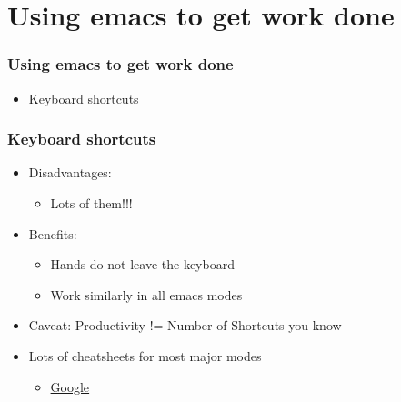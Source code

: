 \documentclass[t,10pt]{beamer}
\begin{document}
\section{Using emacs to get work done}
\label{sec-2}
\begin{frame}
\frametitle{Using emacs to get work done}
\label{sec-2-1}

\begin{itemize}
\item Keyboard shortcuts
\end{itemize}
\end{frame}
\begin{frame}
\frametitle{Keyboard shortcuts}
\label{sec-2-2}
\begin{itemize}

\item Disadvantages:
\label{sec-2-2-1}%

\begin{itemize}

\item Lots of them!!!\\
\label{sec-2-2-1-1}%
\vspace{0.25in}

\vspace{0.25in}
\end{itemize} %

\item Benefits:
\label{sec-2-2-2}%
\begin{itemize}

\item Hands do not leave the keyboard\\
\label{sec-2-2-2-1}%
\item Work similarly in all emacs modes\\
\label{sec-2-2-2-2}%
\vspace{0.25in}
\end{itemize} %

\item Caveat: Productivity != Number of Shortcuts you know\\
\label{sec-2-2-3}%
\vspace{0.25in}

\item Lots of cheatsheets for most major modes
\label{sec-2-2-4}%
\begin{itemize}
\item \href{http://www.google.com}{Google}
\end{itemize}

\end{itemize} %
\end{frame}
\end{document}
